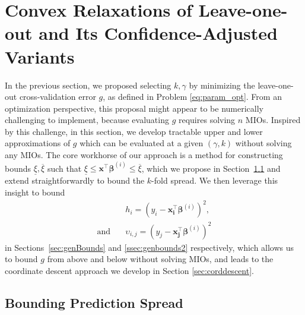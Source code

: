 \documentclass[opre,nonblindrev]{informs3} %
\begin{document}
\section{Convex Relaxations of Leave-one-out and Its Confidence-Adjusted Variants}\label{sec:lowerbounds}
In the previous section, we proposed selecting $k, \gamma$ by minimizing the leave-one-out cross-validation error $g$, as defined in Problem \eqref{eq:param_opt}. From an optimization perspective, this proposal might appear to be numerically challenging to implement, because evaluating $g$ requires solving $n$ MIOs. Inspired by this challenge, in this section, we develop tractable upper and lower approximations of $g$ which can be evaluated at a given $(\gamma, k)$ without solving any MIOs. The core workhorse of our approach is a method for constructing bounds $\underline \xi,\overline\xi$ such that $\underline \xi\leq \bm{x^\top\beta}^{(i)}\leq \overline \xi$, which we propose in Section~\ref{sec:predictionBound} and extend straightforwardly to bound the $k$-fold spread. We then leverage this insight to bound 
\begin{align}
    & h_i=(y_i-\bm{x_i^\top}\bm{\beta}^{(i)})^2,\\
    \text{and} \quad & \upsilon_{i,j}=(y_j-\bm{x_j^\top}\bm{\beta}^{(i)})^2 \label{eqn:epsilondefn}
\end{align} in Sections~\ref{sec:genBounds} and \ref{ssec:genbounds2} respectively, which allows us to bound $g$ from above and below without solving MIOs, and leads to the coordinate descent approach we develop in Section \ref{sec:corddescent}. 

\subsection{Bounding Prediction Spread}\label{sec:predictionBound}
\end{document}
